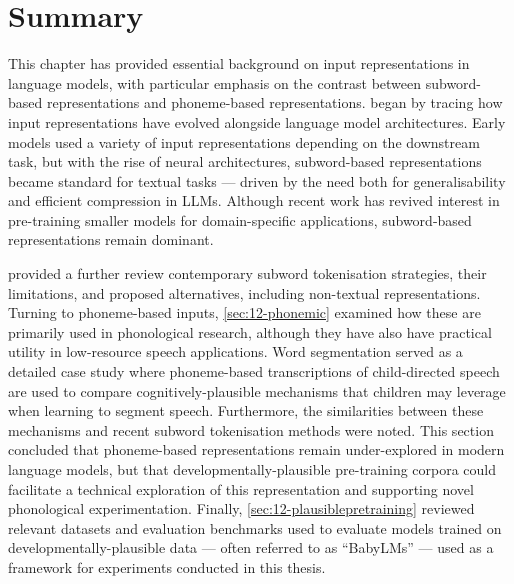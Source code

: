 \section{Summary}


This chapter has provided essential background on input representations in language models, with particular emphasis on the contrast between subword-based representations and phoneme-based representations.  began by tracing how input representations have evolved alongside language model architectures. Early \ngram models used a variety of input representations depending on the downstream task, but with the rise of neural architectures, subword-based representations became standard for textual tasks --- driven by the need both for generalisability and efficient compression in LLMs. Although recent work has revived interest in pre-training smaller models for domain-specific applications, subword-based representations remain dominant.

 provided a further review contemporary subword tokenisation strategies, their limitations, and proposed alternatives, including non-textual representations. Turning to phoneme-based inputs, \cref{sec:12-phonemic} examined how these are primarily used in phonological research, although they have also have practical utility in low-resource speech applications. Word segmentation served as a detailed case study where phoneme-based transcriptions of child-directed speech are used to compare cognitively-plausible mechanisms that children may leverage when learning to segment speech. Furthermore, the similarities between these mechanisms and recent subword tokenisation methods were noted. This section concluded that phoneme-based representations remain under-explored in modern language models, but that developmentally-plausible pre-training corpora could facilitate a technical exploration of this representation and supporting novel phonological experimentation. Finally, \cref{sec:12-plausiblepretraining} reviewed relevant datasets and evaluation benchmarks used to evaluate models trained on developmentally-plausible data --- often referred to as ``BabyLMs'' --- used as a framework for experiments conducted in this thesis. 

